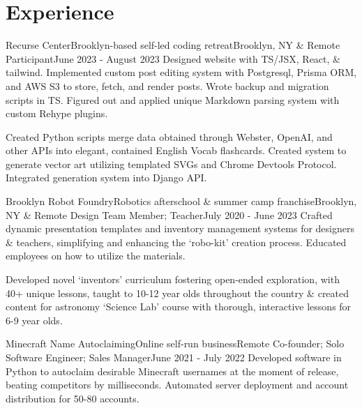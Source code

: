 \documentclass[letterpaper, 10pt]{article}
\begin{document}
	\section{Experience}
	\resumeSubHeadingListStart
	
	\resumeSubheading
	{Recurse Center}{Brooklyn-based self-led coding retreat}{Brooklyn, NY \& Remote}
	{Participant}{June 2023 - August 2023}{}
	\resumeItemListStart
		{Designed website with TS/JSX, React, \& tailwind. Implemented custom post editing system with Postgresql, Prisma ORM, and AWS S3 to store, fetch, and render posts. Wrote backup and migration scripts in TS. Figured out and applied unique Markdown parsing system with custom Rehype plugins.}
		
		{Created Python scripts merge data obtained through Webster, OpenAI, and other APIs into elegant, contained English Vocab flashcards. Created system to generate vector art utilizing templated SVGs and Chrome Devtools Protocol. Integrated generation system into Django API.}
	\resumeItemListEnd
	
	\resumeSubheading
	{Brooklyn Robot Foundry}{Robotics afterschool \& summer camp franchise}{Brooklyn, NY \& Remote}
	{Design Team Member; Teacher}{July 2020 - June 2023}{}
	\resumeItemListStart
		{Crafted dynamic presentation templates and inventory management systems for designers \& teachers, simplifying and enhancing the `robo-kit' creation process. Educated employees on how to utilize the materials.}
		
		{Developed novel `inventors' curriculum fostering open-ended exploration, with 40+ unique lessons, taught to 10-12 year olds throughout the country \& created content for astronomy `Science Lab' course with thorough, interactive lessons for 6-9 year olds.}
		
	\resumeItemListEnd
	
	\resumeSubheading
	{Minecraft Name Autoclaiming}{Online self-run business}{Remote}
	{Co-founder; Solo Software Engineer; Sales Manager}{June 2021 - July 2022}{}
	\resumeItemListStart
		{Developed software in Python to autoclaim desirable Minecraft usernames at the moment of release, beating competitors by milliseconds. Automated server deployment and account distribution for 50-80 accounts.}
		
\end{document}
